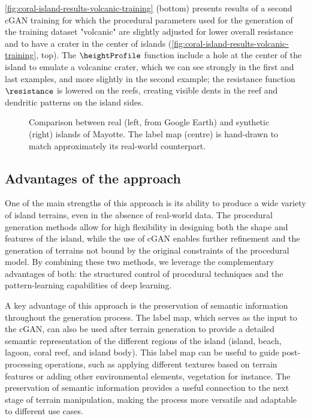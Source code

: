 \cref{fig:coral-island-results-volcanic-training} (bottom) presents results of a second cGAN training for which the procedural parameters used for the generation of the training dataset "volcanic" are slightly adjusted for lower overall resistance and to have a crater in the center of islands (\cref{fig:coral-island-results-volcanic-training}, top). The $\heightProfile$ function include a hole at the center of the island to emulate a volcaninc crater, which we can see strongly in the first and last examples, and more slightly in the second example; the resistance function $\resistance$ is lowered on the reefs, creating visible dents in the reef and dendritic patterns on the island sides.

\begin{figure}
    \caption[Comparison of  the cGAN output with Mayotte Island]{Comparison between real (left, from Google Earth) and synthetic (right) islands of Mayotte. The label map (centre) is hand-drawn to match approximately its real-world counterpart.}
    \label{fig:coral-island-example-Mayotte}
\end{figure}




\subsection{Advantages of the approach}
\label{sec:coral-island-advantages}

One of the main strengths of this approach is its ability to produce a wide variety of island terrains, even in the absence of real-world data. The procedural generation methods allow for high flexibility in designing both the shape and features of the island, while the use of cGAN enables further refinement and the generation of terrains not bound by the original constraints of the procedural model. By combining these two methods, we leverage the complementary advantages of both: the structured control of procedural techniques and the pattern-learning capabilities of deep learning.

A key advantage of this approach is the preservation of semantic information throughout the generation process. The label map, which serves as the input to the cGAN, can also be used after terrain generation to provide a detailed semantic representation of the different regions of the island (island, beach, lagoon, coral reef, and island body). This label map can be useful to guide post-processing operations, such as applying different textures based on terrain features or adding other environmental elements, vegetation for instance. The preservation of semantic information provides a useful connection to the next stage of terrain manipulation, making the process more versatile and adaptable to different use cases.

